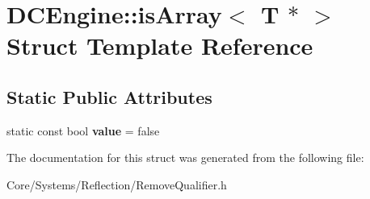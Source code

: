 \hypertarget{structDCEngine_1_1isArray_3_01T_01_5_01_4}{\section{D\-C\-Engine\-:\-:is\-Array$<$ T $\ast$ $>$ Struct Template Reference}
\label{structDCEngine_1_1isArray_3_01T_01_5_01_4}
}
\subsection*{Static Public Attributes}
\begin{DoxyCompactItemize}
\item 
\hypertarget{structDCEngine_1_1isArray_3_01T_01_5_01_4_ad5af9707a106f417327e074af5804779}{static const bool {\bfseries value} = false}\label{structDCEngine_1_1isArray_3_01T_01_5_01_4_ad5af9707a106f417327e074af5804779}

\end{DoxyCompactItemize}


The documentation for this struct was generated from the following file\-:\begin{DoxyCompactItemize}
\item 
Core/\-Systems/\-Reflection/Remove\-Qualifier.\-h\end{DoxyCompactItemize}
